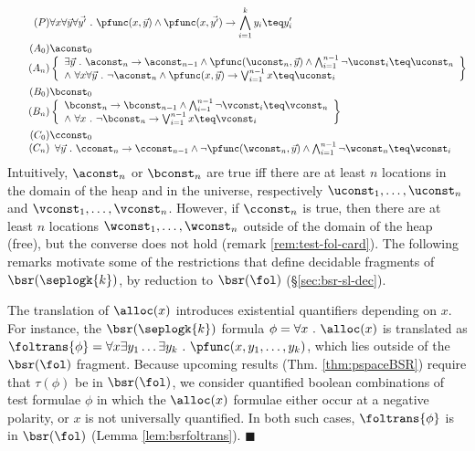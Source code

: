 \begin{align}
\tag{$P$}\label{ax:p} & 
\forall x \forall \vec{y} \forall \vec{y'} ~.~ 
\pfunc(x,\vec{y}) \wedge \pfunc(x,\vec{y'}) \rightarrow \bigwedge_{i=1}^k y_i \teq y'_i
\\
\tag{$A_0$}\label{ax:a0} & \aconst_0 \\[-4pt]
\tag{$A_n$}\label{ax:an} & 
\left\{\begin{array}{l}
\exists \vec{y} ~.~ \aconst_n \rightarrow \aconst_{n-1} \wedge \pfunc(\uconst_n, \vec{y}) \wedge \bigwedge_{i=1}^{n-1} \neg \uconst_i \teq \uconst_n \\
\wedge~ \forall x \forall \vec{y} ~.~ \neg \aconst_n \wedge \pfunc(x, \vec{y}) \rightarrow \bigvee_{i=1}^{n-1} x \teq \uconst_i 
\end{array}\right\}
\\
\tag{$B_0$}\label{ax:b0} & \bconst_0 \\[-4pt]
\tag{$B_n$}\label{ax:bn} & 
\left\{\begin{array}{l}
\bconst_n \rightarrow \bconst_{n-1} \wedge \bigwedge_{i=1}^{n-1} \neg \vconst_i \teq \vconst_n \\
\wedge~ \forall x ~.~ \neg \bconst_n \rightarrow \bigvee_{i=1}^{n-1} x \teq \vconst_i 
\end{array}\right\}\\
\tag{$C_0$}\label{ax:c0} & \cconst_0 \\[-4pt]
\tag{$C_n$}\label{ax:cn} &
\begin{array}{l}
\forall \vec{y} ~.~ \cconst_n \rightarrow \cconst_{n-1} \wedge \neg \pfunc(\wconst_n,\vec{y}) \wedge \bigwedge_{i=1}^{n-1} \neg \wconst_n \teq \wconst_i 
\end{array}
\end{align}
Intuitively, $\aconst_n$ or $\bconst_n$ are true iff there are at
least $n$ locations in the domain of the heap and in the universe,
respectively $\uconst_1, \ldots, \uconst_n$ and $\vconst_1, \ldots,
\vconst_n$. However, if $\cconst_n$ is true, then there are at least
$n$ locations $\wconst_1, \ldots, \wconst_n$ outside of the domain of
the heap (free), but the converse does not hold (remark
\ref{rem:test-fol-card}). The following remarks motivate some of the
restrictions that define decidable fragments of $\bsr(\seplogk{k})$,
by reduction to $\bsr(\fol)$ (\S\ref{sec:bsr-sl-dec}).

\begin{remark}\label{rem:test-fol-alloc}
The translation of $\alloc(x)$ introduces existential quantifiers
depending on $x$. For instance, the $\bsr(\seplogk{k})$ formula $\phi
= \forall x ~.~ \alloc(x)$ is translated as $\foltrans{\phi} = \forall
x \exists y_1 \ldots \exists y_k ~.~ \pfunc(x,y_1,\ldots,y_k)$, which
lies outside of the $\bsr(\fol)$ fragment. Because upcoming results
(Thm. \ref{thm:pspaceBSR}) require that $\tau(\phi)$ be in
$\bsr(\fol)$, we consider quantified boolean combinations of test
formulae $\phi$ in which the $\alloc(x)$ formulae either occur at a
negative polarity, or $x$ is not universally quantified. In both such
cases, $\foltrans{\phi}$ is in $\bsr(\fol)$ (Lemma
\ref{lem:bsrfoltrans}).  \hfill$\blacksquare$
\end{remark}

